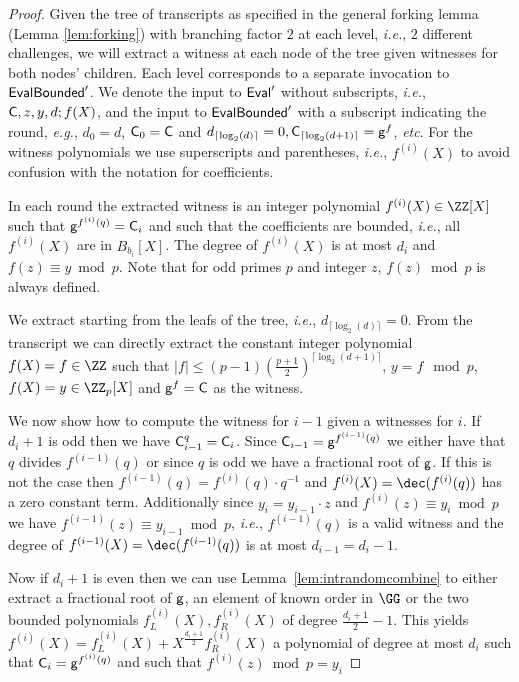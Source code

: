 \documentclass{article}
\theoremstyle{definition}
\begin{document}
\begin{proof}
Given the tree of transcripts as specified in the general forking lemma (Lemma \ref{lem:forking})  with branching factor $2$ at each level, \emph{i.e.}, $2$ different challenges, we will extract a witness at each node of the tree given witnesses for both nodes' children. Each level corresponds to a separate invocation to $\textsf{{EvalBounded}}'$. We denote the input to $\textsf{{Eval}}'$ without subscripts, \emph{i.e.}, $\mathsf{C},z,y,d;f(X)$, and the input to $\textsf{{EvalBounded}}'$ with a subscript indicating the round, \emph{e.g.}, $d_0=d$, $\mathsf{C}_0=\mathsf{C}$ and $d_{\lceil \log_2(d)\rceil }=0,\mathsf{C}_{\lceil \log_2(d+1)\rceil }=\mathsf{g}^{f}$, \emph{etc}. For the witness polynomials we use superscripts and parentheses, \emph{i.e.}, $f^{(i)}(X)$ to avoid confusion with the notation for coefficients.  

In each round the extracted witness is an integer polynomial $f^{(i)}(X)\in \ZZ[X]$ such that $\mathsf{g}^{f^{(i)}(q)}=\mathsf{C}_i$ and such that the coefficients are bounded, \emph{i.e.}, all $f^{(i)}(X)$ are in $B_{b_i}[X]$. The degree of $f^{(i)}(X)$ is at most $d_i$ and $f(z) \equiv y \bmod p$. Note that for odd primes $p$ and integer $z$, $f(z)\bmod p$ is always defined.

We extract starting from the leafs of the tree, \emph{i.e.}, $d_{\lceil \log_2(d)\rceil}=0$. From the transcript we can directly extract the constant integer polynomial $f(X)=f \in \ZZ$ such that $\vert f \vert \leq(p-1) (\frac{p+1}{2})^{\lceil \log_2(d+1)\rceil}$, $y=f \mod p$, $f(X)=y\in \ZZ_p[X]$ and $\mathsf{g}^{f}=\mathsf{C}$ as the witness.

We now show how to compute the witness for $i-1$ given a witnesses for $i$. 
If $d_i+1$ is odd then we have $\mathsf{C}_{i-1}^q=\mathsf{C}_i$. Since $\mathsf{C}_{i-1}=\mathsf{g}^{f^{(i-1)}(q)}$ we either have that $q$ divides $f^{(i-1)}(q)$ or since $q$ is odd we have a fractional root of $\mathsf{g}$. 
If this is not the case then $f^{(i-1)}(q)=f^{(i)}(q)\cdot q^{-1}$ and $f^{(i)}(X)=\dec(f^{(i)}(q))$ has a zero constant term. Additionally since $y_i=y_{i-1}\cdot z$ and $f^{(i)}(z)\equiv y_i \bmod p$ we have $f^{(i-1)}(z)\equiv y_{i-1} \bmod p$, \emph{i.e.}, $f^{(i-1)}(q)$ is a valid witness and the degree of $f^{(i-1)}(X)=\dec(f^{(i-1)}(q))$ is at most $d_{i-1}=d_i-1$. 

Now if $d_i+1$ is even then we can use Lemma~\ref{lem:intrandomcombine} to either extract a fractional root of $\mathsf{g}$, an element of known order in $\GG$ or the two bounded polynomials $f_{L}^{(i)}(X),f_{R}^{(i)}(X)$ of degree $\frac{d_i+1}{2}-1$. 
This yields $f^{(i)}(X)=f_{L}^{(i)}(X)+X^{\frac{d_i+1}{2}} f_{R}^{(i)}(X)$ a polynomial of degree at most $d_i$ such that $\mathsf{C}_i=\mathsf{g}^{f^{(i)}(q)}$ and such that $f^{(i)}(z) \bmod p=y_i$


\end{proof}
\end{document}
